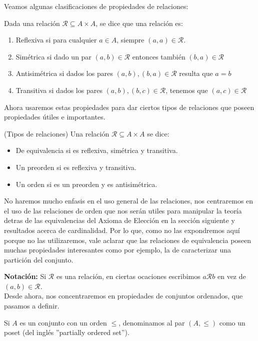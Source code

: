 \documentclass[12pt,a4paper]{book}
\begin{document}
Veamos algunas clasificaciones de propiedades de relaciones:
\begin{defi} %
Dada una relación $\mathcal{R} \subseteq A \times A$, se dice que una relación es:
\begin{enumerate}
\item Reflexiva si para cualquier $a \in A$, siempre $(a,a) \in \mathcal{R}$.
\item Simétrica si dado un par $(a,b)\in \mathcal{R}$ entonces también $(b,a) \in \mathcal{R}$
\item Antisimétrica si dados los pares $(a,b),(b,a)\in \mathcal{R}$ resulta que $a = b$
\item Transitiva si dados los pares $(a,b),(b,c) \in \mathcal{R}$, tenemos que $(a,c) \in \mathcal{R}$
\end{enumerate}
\end{defi}

Ahora usaremos estas propiedades para dar ciertos tipos de relaciones que poseen propiedades útiles e importantes.

\begin{defi}(Tipos de relaciones)
Una relación $\mathcal{R} \subseteq A \times A$ se dice:
\begin{itemize}
\item De equivalencia si es reflexiva, simétrica y transitiva.
\item Un preorden si es reflexiva y transitiva.
\item Un orden si es un preorden y es antisimétrica.
\end{itemize}
\end{defi}

No haremos mucho enfasis en el uso general de las relaciones, nos centraremos en el uso de las relaciones de orden que nos serán utiles para manipular la teoría detras de las equivalencias del Axioma de Elección en la sección siguiente y resultados acerca de cardinalidad. Por lo que, como no las expondremos aquí porque no las utilizaremos, vale aclarar que las relaciones de equivalencia poseen muchas propiedades interesantes como por ejemplo, la de caracterizar una partición del conjunto.

\textbf{Notación:} Si $\mathcal{R}$ es una relación, en ciertas ocaciones escribimos $a \mathcal{R} b$ en vez de $(a,b) \in \mathcal{R}$.\\[0.5cm]
Desde ahora, nos concentraremos en propiedades de conjuntos ordenados, que pasamos a definir.

\begin{defi} %
Si $A$ es un conjunto con un orden $\leq$, denominamos al par $(A,\leq)$ como un poset (del inglés ''partially ordered set'').
\end{defi}
\end{document}
